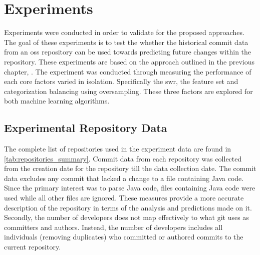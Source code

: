\chapter{Experiments}
\label{chap:experiments}

Experiments were conducted in order to validate for the proposed approaches. The goal of these experiments is to test the whether the historical commit data from an \gls{oss} repository can be used towards predicting future changes within the repository. These experiments are based on the approach outlined in the previous chapter, . The experiment was conducted through measuring the performance of each core factors varied in isolation. Specifically the \gls{swr}, the feature set and categorization balancing using oversampling. These three factors are explored for both machine learning algorithms.

\section{Experimental Repository Data}
\label{sec:experimental_repository_data}



The complete list of repositories used in the experiment data are found in \autoref{tab:repositories_summary}. Commit data from each repository was collected from the creation date for the repository till the data collection date. The commit data excludes any commit that lacked a change to a file containing Java code. Since the primary interest was to parse Java code, files containing Java code were used while all other files are ignored. These measures provide a more accurate description of the repository in terms of the analysis and predictions made on it. Secondly, the number of developers does not map effectively to what git uses as committers and authors. Instead, the number of developers includes all individuals (removing duplicates) who committed or authored commits to the current repository.

